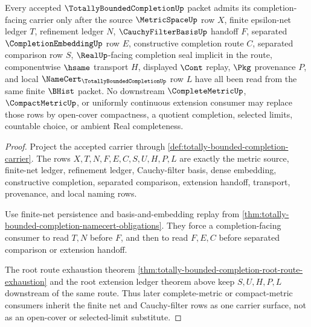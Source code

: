 \begin{theorem}
\label{thm:totally-bounded-completion-net-filter-carrier-admission}
Every accepted $\TotallyBoundedCompletionUp$ packet admits its completion-facing carrier only after the source $\MetricSpaceUp$ row $X$, finite epsilon-net ledger $T$, refinement ledger $N$, $\CauchyFilterBasisUp$ handoff $F$, separated $\CompletionEmbeddingUp$ row $E$, constructive completion route $C$, separated comparison row $S$, $\RealUp$-facing completion seal implicit in the route, componentwise $\hsame$ transport $H$, displayed $\Cont$ replay, $\Pkg$ provenance $P$, and local $\NameCert_{\TotallyBoundedCompletionUp}$ row $L$ have all been read from the same finite $\BHist$ packet. No downstream $\CompleteMetricUp$, $\CompactMetricUp$, or uniformly continuous extension consumer may replace those rows by open-cover compactness, a quotient completion, selected limits, countable choice, or ambient Real completeness.
\end{theorem}
\begin{proof}
Project the accepted carrier through \autoref{def:totally-bounded-completion-carrier}. The rows $X,T,N,F,E,C,S,U,H,P,L$ are exactly the metric source, finite-net ledger, refinement ledger, Cauchy-filter basis, dense embedding, constructive completion, separated comparison, extension handoff, transport, provenance, and local naming rows.

Use finite-net persistence and basis-and-embedding replay from \autoref{thm:totally-bounded-completion-namecert-obligations}. They force a completion-facing consumer to read $T,N$ before $F$, and then to read $F,E,C$ before separated comparison or extension handoff.

The root route exhaustion theorem \autoref{thm:totally-bounded-completion-root-route-exhaustion} and the root extension ledger theorem above keep $S,U,H,P,L$ downstream of the same route. Thus later complete-metric or compact-metric consumers inherit the finite net and Cauchy-filter rows as one carrier surface, not as an open-cover or selected-limit substitute.
\end{proof}


